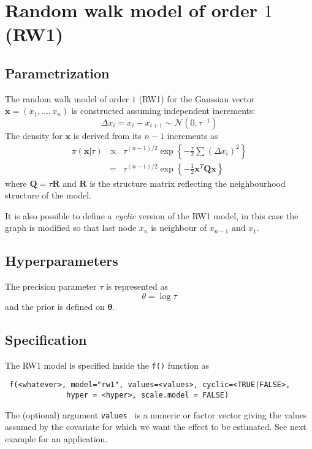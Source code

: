 \documentclass[a4paper,11pt]{article}
\begin{document}
\section*{Random walk model of order $1$ (RW1)}

\subsection*{Parametrization}

The random walk model of order $1$ (RW1) for the Gaussian vector
$\mathbf{x}=(x_1,\dots,x_n)$ is constructed assuming independent
increments:
\[
\Delta x_i = x_i-x_{i+1}\sim\mathcal{N}(0,\tau^{-1})
\]
The density for $\mathbf{x}$ is derived from its $n-1$ increments as
\begin{eqnarray*}
    \pi(\mathbf{x}|\tau) &\propto& \tau^{(n-1)/2}
    \exp\left\{-\frac{\tau}{2}\sum (\Delta x_i)^2\right\}\\
    & = &\tau^{(n-1)/2}\exp\left\{-\frac{1}{2}
      \mathbf{x}^T\mathbf{Q}\mathbf{x} \right\}
\end{eqnarray*}
where $\mathbf{Q}=\tau\mathbf{R}$ and $\mathbf{R}$ is the structure
matrix reflecting the neighbourhood structure of the model.

It is also possible to define a {\it cyclic} version of the RW1 model,
in this case the graph is modified so that last node $x_n$ is
neighbour of $x_{n-1}$ and $x_1$.
\subsection*{Hyperparameters}

The precision parameter $\tau$ is represented as
\begin{displaymath}
    \theta =\log \tau
\end{displaymath}
and the prior is defined on $\mathbf{\theta}$.

\subsection*{Specification}

The RW1 model is specified inside the {\tt f()} function as
\begin{verbatim}
 f(<whatever>, model="rw1", values=<values>, cyclic=<TRUE|FALSE>,
              hyper = <hyper>, scale.model = FALSE)
\end{verbatim}
The (optional) argument {\tt values } is a numeric or factor vector
giving the values assumed by the covariate for which we want the
effect to be estimated. See next example for an application.
 
\end{document}
